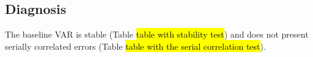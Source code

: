 \subsection{Diagnosis}

The baseline VAR is stable (Table \hl{table with stability test}) and does not present serially correlated errors (Table \hl{table with the serial correlation test}).